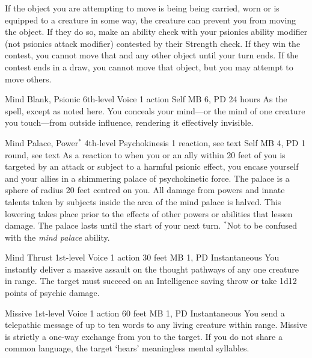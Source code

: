 If the object you are attempting to move is being being carried,
worn or is equipped to a creature in some way,
the creature can prevent you from moving the object.
If they do so, make an ability check with your
psionics ability modifier (not psionics attack modifier)
contested by their Strength check.
If they win the contest, you cannot move that and
any other object until your turn ends.
If the contest ends in a draw, you cannot move
that object, but you may attempt to move others.
  
\DndPowerHeader%
  {Mind Blank, Psionic}
  {6th-level Voice}
  {1 action}
  {Self}
  {MB 6, PD \lvlsix}
  {24 hours}
As the  spell, except as noted here.
You conceals your mind---or
the mind of one creature you touch---from
outside influence,
rendering it effectively invisible. 

\DndPowerHeader%
  {Mind Palace, Power$^*$}
  {4th-level Psychokinesis}
  {1 reaction, see text}
  {Self}
  {MB 4, PD \lvlfour}
  {1 round, see text}
As a reaction to when you or an ally within 20 feet of you
is targeted by an attack or subject to a harmful psionic effect,
you encase yourself and your allies in a
shimmering palace of psychokinetic force.
The palace is a sphere of radius 20 feet centred on you. 
All damage from powers and innate talents
taken by subjects inside the area of the mind palace
is halved.
This lowering takes place prior to the effects
of other powers or abilities that lessen damage.
The palace lasts until the start of your next turn.
$^*$Not to be confused with the \emph{mind palace} ability.

\DndPowerHeader%
  {Mind Thrust}
  {1st-level Voice}
  {1 action}
  {30 feet}
  {MB 1, PD \lvlone}
  {Instantaneous}
You instantly deliver a massive assault on the thought pathways
of any one creature in range.
The target must succeed on an Intelligence saving throw
or take 1d12 points of psychic damage.

\DndPowerHeader%
  {Missive}
  {1st-level Voice}
  {1 action}
  {60 feet}
  {MB 1, PD \lvlone}
  {Instantaneous}
You send a telepathic message of up to ten words to
any living creature within range.
Missive is strictly a one-way exchange from you to the target.
If you do not share a common language,
the target `hears' meaningless mental syllables.

